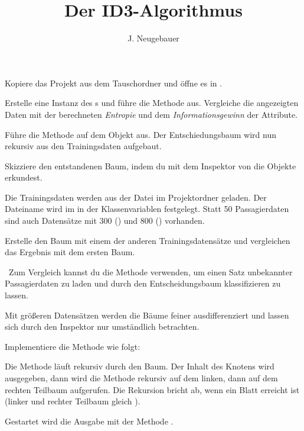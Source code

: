 \documentclass[10pt, a4paper]{scrartcl}
\author{J. Neugebauer}
\title{Der ID3-Algorithmus}
\date{\Heute}
\begin{document}
\ReiheTitel

Kopiere das Projekt  aus dem Tauschordner
und öffne es in .

\begin{aufgabe}
	Erstelle eine Instanz des s und führe die Methode 
	 aus. Vergleiche die angezeigten Daten mit
	der berechneten \emph{Entropie} und dem \emph{Informationsgewinn} der Attribute.
\end{aufgabe}

\begin{aufgabe}
	Führe die Methode  auf dem Objekt aus. Der
	Entschiedungsbaum wird nun rekursiv aus den Trainingsdaten aufgebaut.
	
	Skizziere den entstandenen Baum, indem du mit dem Inspektor von 
	 die Objekte erkundest.
	
	\begin{rahmen}
		\vspace*{4cm}
	\end{rahmen}
	\medskip
\end{aufgabe}

\begin{aufgabe}
	Die Trainingsdaten werden aus der Datei  im
	Projektordner geladen. Der Dateiname wird im  in der Klassenvariablen
	 festgelegt. Statt 50 Passagierdaten sind auch Datensätze mit
	300 () und 800 ()
	vorhanden.
	
	Erstelle den Baum mit einem der anderen Trainingsdatensätze und vergleichen
	das Ergebnis mit dem ersten Baum.
	
	\symInfo\ Zum Vergleich kannst du die Methode  verwenden, um einen Satz
	unbekannter Passagierdaten zu laden und durch den Entscheidungsbaum klassifizieren zu lassen.
\end{aufgabe}

\begin{aufgabe}
	Mit größeren Datensätzen werden die Bäume feiner ausdifferenziert und lassen sich durch
	den Inspektor nur umständlich betrachten.
	
	Implementiere die Methode  wie folgt:
	
	Die Methode läuft rekursiv durch den Baum. Der Inhalt des Knotens wird ausgegeben, dann wird die Methode
	rekursiv auf dem linken, dann auf dem rechten Teilbaum aufgerufen. Die Rekursion bricht ab, wenn ein Blatt
	erreicht ist (linker und rechter Teilbaum gleich ).
	
	Gestartet wird die Ausgabe mit der Methode .
\end{aufgabe}
\end{document}
